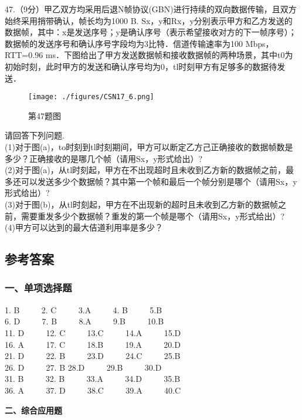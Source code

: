 47.（9分）甲乙双方均采用后退N帧协议(GBN)进行持续的双向数据传输，且双方始终采用捎带确认，帧长均为1000 B. Sx，y和Rx，y分别表示甲方和乙方发送的数据帧，其中：x是发送序号；y是确认序号（表示希望接收对方的下一帧序号）；数据帧的发送序号和确认序号字段均为3比特．信道传输速率为100 Mbps，RTT=0.96 ms．下图给出了甲方发送数据帧和接收数据帧的两种场景，其中t0为初始时刻，此时甲方的发送和确认序号均为0，tl时刻甲方有足够多的数据待发送．
\begin{figure}[ht]
\centering
\texttt{[image: ./figures/CSN17\_6.png]}
\caption{第47题图} \label{CSN17_fig6}
\end{figure}
请回答下列问题.  \\
(1)对于图(a)，to时刻到tl时刻期间，甲方可以断定乙方己正确接收的数据帧数是多少？正确接收的是哪几个帧（请用Sx，y形式给出）? \\
(2)对于图(a)，从tl时刻起，甲方在不出现超时且未收到乙方新的数据帧之前，最多还可以发送多少个数据帧？其中第一个帧和最后一个帧分别是哪个（请用Sx，y形式给出）? \\
(3)对于图(b)，从tl时刻起，甲方在不出现新的超时且未收到乙方新的数据帧之前，需要重发多少个数据帧？重发的第一个帧是哪个（请用Sx，y形式给出）? \\
(4)甲方可以达到的最大佶道利用率是多少？


\subsection{参考答案}
\subsubsection{一、单项选择题}

1. B  $\qquad$ 2. C $\qquad$ 3.A $\qquad$ 4. B $\qquad$ 5.B \\
6. D $\qquad$ 7. B $\qquad$ 8.A $\qquad$ 9.B $\qquad$ 10.B \\
11. D $\qquad$ 12. C $\qquad$ 13.C $\qquad$ 14.A $\qquad$ 15.D \\
16. A $\qquad$ 17. C $\qquad$ 18.B $\qquad$ 19.A $\qquad$ 20.D \\
21. D $\qquad$ 22. B $\qquad$ 23.D $\qquad$ 24.C $\qquad$ 25.B \\
26. D $\qquad$ 27. B 28.D $\qquad$ 29.B $\qquad$ 30.D \\
31. B $\qquad$ 32. B $\qquad$ 33.A $\qquad$ 34.D $\qquad$ 35.B \\
36. A $\qquad$ 37. D $\qquad$ 38.C $\qquad$ 39.A $\qquad$ 40.C

  \textbf{二、综合应用题}

